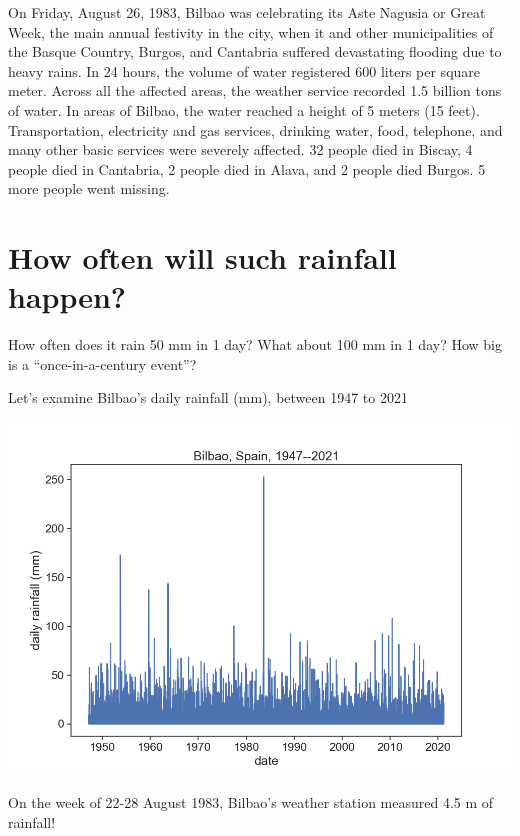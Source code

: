 \documentclass[
  letterpaper,
  DIV=11,
  numbers=noendperiod]{scrreprt}
\begin{document}
On Friday, August 26, 1983, Bilbao was celebrating its Aste Nagusia or
Great Week, the main annual festivity in the city, when it and other
municipalities of the Basque Country, Burgos, and Cantabria suffered
devastating flooding due to heavy rains. In 24 hours, the volume of
water registered 600 liters per square meter. Across all the affected
areas, the weather service recorded 1.5 billion tons of water. In areas
of Bilbao, the water reached a height of 5 meters (15 feet).
Transportation, electricity and gas services, drinking water, food,
telephone, and many other basic services were severely affected. 32
people died in Biscay, 4 people died in Cantabria, 2 people died in
Alava, and 2 people died Burgos. 5 more people went missing.

\hypertarget{how-often-will-such-rainfall-happen}{%
\section{How often will such rainfall
happen?}\label{how-often-will-such-rainfall-happen}}

How often does it rain 50 mm in 1 day? What about 100 mm in 1 day? How
big is a ``once-in-a-century event''?

Let's examine Bilbao's daily rainfall (mm), between 1947 to 2021

\includegraphics{archive/figures/bilbao-1947-2021.png}

On the week of 22-28 August 1983, Bilbao's weather station measured 4.5
m of rainfall!
\end{document}
